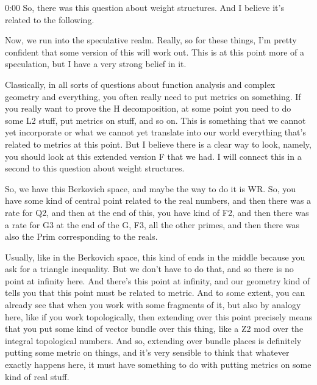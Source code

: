 \begin{unfinished}{0:00}
So, there was this question about weight structures. And I believe it's related to the following.

Now, we run into the speculative realm. Really, so for these things, I'm pretty confident that some version of this will work out. This is at this point more of a speculation, but I have a very strong belief in it.

Classically, in all sorts of questions about function analysis and complex geometry and everything, you often really need to put metrics on something. If you really want to prove the H decomposition, at some point you need to do some L2 stuff, put metrics on stuff, and so on. This is something that we cannot yet incorporate or what we cannot yet translate into our world everything that's related to metrics at this point. But I believe there is a clear way to look, namely, you should look at this extended version F that we had. I will connect this in a second to this question about weight structures.

So, we have this Berkovich space, and maybe the way to do it is WR. So, you have some kind of central point related to the real numbers, and then there was a rate for Q2, and then at the end of this, you have kind of F2, and then there was a rate for G3 at the end of the G, F3, all the other primes, and then there was also the Prim corresponding to the reals.

Usually, like in the Berkovich space, this kind of ends in the middle because you ask for a triangle inequality. But we don't have to do that, and so there is no point at infinity here. And there's this point at infinity, and our geometry kind of tells you that this point must be related to metric. And to some extent, you can already see that when you work with some fragments of it, but also by analogy here, like if you work topologically, then extending over this point precisely means that you put some kind of vector bundle over this thing, like a Z2 mod over the integral topological numbers. And so, extending over bundle places is definitely putting some metric on things, and it's very sensible to think that whatever exactly happens here, it must have something to do with putting metrics on some kind of real stuff.


\end{unfinished}
